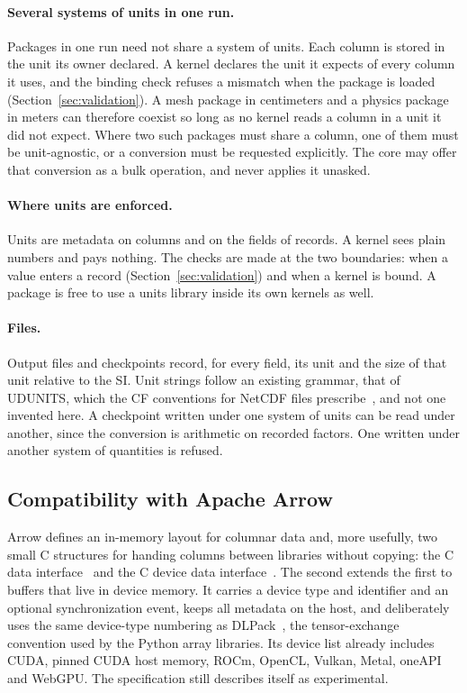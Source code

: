 \documentclass[11pt,a4paper]{article}
\begin{document}
\paragraph{Several systems of units in one run.}  Packages in one run need
not share a system of units.  Each column is stored in the unit its owner
declared.  A kernel declares the unit it expects of every column it uses,
and the binding check refuses a mismatch when the package is loaded
(Section~\ref{sec:validation}).  A mesh package in centimeters and a physics
package in meters can therefore coexist so long as no kernel reads a column
in a unit it did not expect.  Where two such packages must share a column,
one of them must be unit-agnostic, or a conversion must be requested
explicitly.  The core may offer that conversion as a bulk operation, and
never applies it unasked.

\paragraph{Where units are enforced.}  Units are metadata on columns and on
the fields of records.  A kernel sees plain numbers and pays nothing.  The
checks are made at the two boundaries: when a value enters a record
(Section~\ref{sec:validation}) and when a kernel is bound.  A package is
free to use a units library inside its own kernels as well.

\paragraph{Files.}  Output files and checkpoints record, for every field,
its unit and the size of that unit relative to the SI.  Unit strings follow
an existing grammar, that of UDUNITS, which the CF conventions for NetCDF
files prescribe~\cite{cfconventions}, and not one invented here.  A
checkpoint written under one system of units can be read under another,
since the conversion is arithmetic on recorded factors.  One written under
another system of quantities is refused.

\subsection{Compatibility with Apache Arrow}

Arrow defines an in-memory layout for columnar data and, more usefully, two
small C structures for handing columns between libraries without copying: the
C data interface~\cite{arrowcdata} and the C device data
interface~\cite{arrowcdevice}.  The second extends the first to buffers that
live in device memory.  It carries a device type and identifier and an
optional synchronization event, keeps all metadata on the host, and
deliberately uses the same device-type numbering as DLPack~\cite{dlpack}, the
tensor-exchange convention used by the Python array libraries.  Its device
list already includes CUDA, pinned CUDA host memory, ROCm, OpenCL, Vulkan,
Metal, oneAPI and WebGPU.  The specification still describes itself as
experimental.
\end{document}
